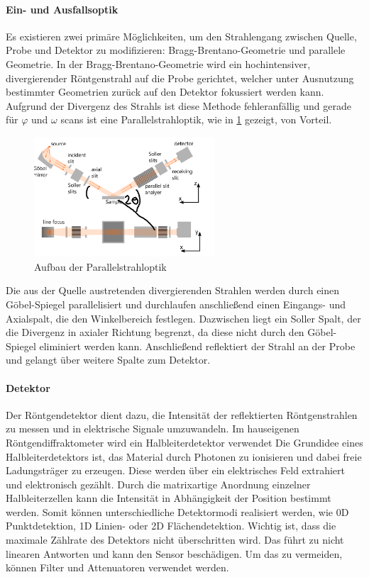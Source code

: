 \paragraph{Ein- und Ausfallsoptik}
Es existieren zwei primäre Möglichkeiten, um den Strahlengang zwischen Quelle, Probe und Detektor zu modifizieren:
Bragg-Brentano-Geometrie und parallele Geometrie.
In der Bragg-Brentano-Geometrie wird ein hochintensiver, divergierender Röntgenstrahl auf die Probe gerichtet,
welcher unter Ausnutzung bestimmter Geometrien zurück auf den Detektor fokussiert werden kann.
Aufgrund der Divergenz des Strahls ist diese Methode fehleranfällig und gerade für $\varphi$ und $\omega$ scans
ist eine Parallelstrahloptik, wie in \cref{fig:xrd_parallel} gezeigt, von Vorteil.
\begin{figure}
    \centering
    \includegraphics[width=0.6\textwidth]{../assets/messmethoden/xrd/paralleloptik}
    \caption{Aufbau der Parallelstrahloptik }
    \label{fig:xrd_parallel}
\end{figure}
Die aus der Quelle austretenden divergierenden Strahlen werden durch einen Göbel-Spiegel
parallelisiert und durchlaufen anschließend einen Eingangs- und Axialspalt, die den Winkelbereich
festlegen.
Dazwischen liegt ein Soller Spalt, der die Divergenz in axialer Richtung begrenzt, da diese
nicht durch den Göbel-Spiegel eliminiert werden kann.
Anschließend reflektiert der Strahl an der Probe und gelangt über weitere Spalte zum Detektor.

\paragraph{Detektor}
Der Röntgendetektor dient dazu, die Intensität der reflektierten Röntgenstrahlen zu messen und
in elektrische Signale umzuwandeln.
Im hauseigenen Röntgendiffraktometer wird ein Halbleiterdetektor verwendet
Die Grundidee eines Halbleiterdetektors ist, das Material durch Photonen zu ionisieren und dabei freie Ladungsträger zu
erzeugen.
Diese werden über ein elektrisches Feld extrahiert und elektronisch gezählt.
Durch die matrixartige Anordnung einzelner Halbleiterzellen kann die Intensität in Abhängigkeit der Position bestimmt
werden.
Somit können unterschiedliche Detektormodi realisiert werden, wie 0D Punktdetektion,
1D Linien- oder 2D Flächendetektion.
Wichtig ist, dass die maximale Zählrate des Detektors nicht überschritten wird.
Das führt zu nicht linearen Antworten und kann den Sensor beschädigen.
Um das zu vermeiden, können Filter und Attenuatoren verwendet werden.

